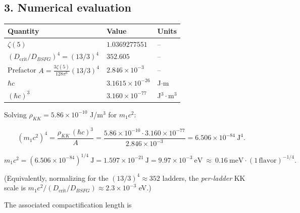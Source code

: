 \documentclass[
]{article}
\newcounter{none} %
\begin{document}
\subsection{3. Numerical evaluation}\label{numerical-evaluation}

{\def\LTcaptype{none} %
\begin{longtable}[]{@{}
  >{\raggedright\arraybackslash}p{}
  >{\raggedright\arraybackslash}p{}
  >{\raggedright\arraybackslash}p{}@{}}
\toprule\noalign{}
\begin{minipage}[b]{\linewidth}\raggedright
Quantity
\end{minipage} & \begin{minipage}[b]{\linewidth}\raggedright
Value
\end{minipage} & \begin{minipage}[b]{\linewidth}\raggedright
Units
\end{minipage} \\
\midrule\noalign{}
\endhead
\bottomrule\noalign{}
\endlastfoot
\(\zeta(5)\) & \(1.0369277551\) & -- \\
\((D_{\mathrm{crit}}/D_{BSFG})^4 = (13/3)^4\) & \(352.605\) & -- \\
Prefactor \(A=\tfrac{3\zeta(5)}{128\pi^6}(13/3)^4\) &
\(2.846\times 10^{-3}\) & -- \\
\(\hbar c\) & \(3.1615\times 10^{-26}\) & J\(\cdot\)m \\
\((\hbar c)^3\) & \(3.160\times 10^{-77}\) & J\(^3\cdot\)m\(^3\) \\
\end{longtable}
}

Solving \(\rho_{KK}=5.86\times 10^{-10}\) J/m\(^3\) for \(m_1 c^2\):

\[
(m_1 c^2)^4 = \frac{\rho_{KK}\,(\hbar c)^3}{A} = \frac{5.86\times 10^{-10}\cdot 3.160\times 10^{-77}}{2.846\times 10^{-3}}
= 6.506\times 10^{-84}\ \mathrm{J}^4.
\]

\[
m_1 c^2 = (6.506\times 10^{-84})^{1/4}\ \mathrm{J} = 1.597\times 10^{-21}\ \mathrm{J}
= 9.97\times 10^{-3}\ \mathrm{eV}\ \approx\ 0.16\ \mathrm{meV}\cdot (1\,\mathrm{flavor})^{-1/4}.
\]

(Equivalently, normalizing for the \((13/3)^4\approx 352\) ladders, the
\emph{per-ladder} KK scale is
\(m_1 c^2 / (D_{\mathrm{crit}}/D_{BSFG}) \approx 2.3\times 10^{-3}\)
eV.)

The associated compactification length is
\end{document}
